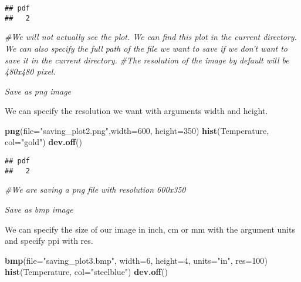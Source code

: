 \documentclass[]{book}
\newenvironment{Shaded}{\begin{snugshade}}{\end{snugshade}}
\newcommand{\KeywordTok}[1]{\textcolor[rgb]{0.13,0.29,0.53}{\textbf{#1}}}
\newcommand{\DataTypeTok}[1]{\textcolor[rgb]{0.13,0.29,0.53}{#1}}
\newcommand{\DecValTok}[1]{\textcolor[rgb]{0.00,0.00,0.81}{#1}}
\newcommand{\StringTok}[1]{\textcolor[rgb]{0.31,0.60,0.02}{#1}}
\newcommand{\CommentTok}[1]{\textcolor[rgb]{0.56,0.35,0.01}{\textit{#1}}}
\newcommand{\NormalTok}[1]{#1}
\theoremstyle{definition}
\theoremstyle{definition}
\theoremstyle{definition}
\theoremstyle{remark}
\begin{document}
\begin{verbatim}
## pdf 
##   2
\end{verbatim}

\begin{Shaded}
\begin{Highlighting}[]
\CommentTok{#We will not actually see the plot. We can find this plot in the current directory. We can also specify the full path of the file we want to save if we don't want to save it in the current directory.}
\CommentTok{#The resolution of the image by default will be 480x480 pixel.}
\end{Highlighting}
\end{Shaded}

\emph{Save as png image}

We can specify the resolution we want with arguments width and height.

\begin{Shaded}
\begin{Highlighting}[]
\KeywordTok{png}\NormalTok{(}\DataTypeTok{file=}\StringTok{"saving_plot2.png"}\NormalTok{,}\DataTypeTok{width=}\DecValTok{600}\NormalTok{, }\DataTypeTok{height=}\DecValTok{350}\NormalTok{)}
\KeywordTok{hist}\NormalTok{(Temperature, }\DataTypeTok{col=}\StringTok{"gold"}\NormalTok{)}
\KeywordTok{dev.off}\NormalTok{()}
\end{Highlighting}
\end{Shaded}

\begin{verbatim}
## pdf 
##   2
\end{verbatim}

\begin{Shaded}
\begin{Highlighting}[]
\CommentTok{#We are saving a png file with resolution 600x350}
\end{Highlighting}
\end{Shaded}

\emph{Save as bmp image}

We can specify the size of our image in inch, cm or mm with the argument
units and specify ppi with res.

\begin{Shaded}
\begin{Highlighting}[]
\KeywordTok{bmp}\NormalTok{(}\DataTypeTok{file=}\StringTok{"saving_plot3.bmp"}\NormalTok{,}
   \DataTypeTok{width=}\DecValTok{6}\NormalTok{, }\DataTypeTok{height=}\DecValTok{4}\NormalTok{, }\DataTypeTok{units=}\StringTok{"in"}\NormalTok{, }\DataTypeTok{res=}\DecValTok{100}\NormalTok{)}
\KeywordTok{hist}\NormalTok{(Temperature, }\DataTypeTok{col=}\StringTok{"steelblue"}\NormalTok{)}
\KeywordTok{dev.off}\NormalTok{()}
\end{Highlighting}
\end{Shaded}
\end{document}
